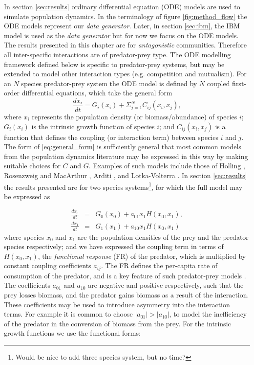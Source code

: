In section \ref{sec:results} ordinary differential equation (ODE) models are used to simulate population dynamics. In the terminology of figure \ref{fig:method_flow} the ODE models represent our \emph{data generator}. Later, in section \ref{sec:ibm}, the IBM model is used as the \emph{data generator} but for now we focus on the ODE models. The results presented in this chapter are for \emph{antagonistic} communities. Therefore all inter-specific interactions are of predator-prey type. The ODE modelling framework defined below is specific to predator-prey systems, but may be extended  to model other interaction types (e.g. competition and mutualism). For an $N$ species predator-prey system the ODE model is defined by $N$ coupled first-order differential equations, which take the general form
\begin{equation}
\frac{dx_i}{dt} = G_i(x_i) + \Sigma_{j=1}^N C_{ij}(x_i,x_j),
\label{eq:general_form}
\end{equation}
%
where $x_i$ represents the population density (or biomass/abundance) of species $i$; $G_i(x_i)$ is the intrinsic growth function of species $i$; and $C_{ij}(x_i,x_j)$ is a function that defines the coupling (or interaction term) between species $i$ and $j$. The form of \eqref{eq:general_form} is sufficiently general that most common models from the population dynamics literature may be expressed in this way by making suitable choices for $C$ and $G$. Examples of such models include those of Holling \cite{holling1959some}, Rosenzweig and MacArthur \cite{rosenzweig1963graphical}, Arditi \cite{arditi2012species}, and Lotka-Volterra \cite{volterra1926,lotka1925elements}. In section \ref{sec:results} the results presented are for two species systems\footnote{Would be nice to add three species system, but no time?}, for which the full model may be expressed as

\begin{eqnarray}
\frac{dx_0}{dt} &=& G_{0}(x_0) + a_{01}x_1H(x_0,x_1),  \nonumber \\[10pt]
\frac{dx_1}{dt} &=& G_{1}(x_1) + a_{10}x_1H(x_0,x_1)
\label{eq:two_species}
\end{eqnarray}
%
where species $x_0$ and $x_1$ are the population densities of the prey and the predator species respectively; and we have expressed the coupling term in terms of $H(x_0,x_1)$, the \emph{functional response} (FR) of the predator, which is multiplied by constant coupling coefficients $a_{ij}$. The FR defines the per-capita rate of consumption of the predator, and is a key feature of such predator-prey models \cite{barraquand2014functional,jost2000identifying}. The coefficients $a_{01}$ and $a_{10}$ are negative and positive respectively, such that the prey losses biomass, and the predator gains biomass as a result of the interaction. These coefficients may be used to introduce asymmetry into the interaction terms. For example it is common to choose $|a_{01}| > |a_{10}|$, to model the inefficiency of the predator in the conversion of biomass from the prey. For the intrinsic growth functions we use the functional forms:  

